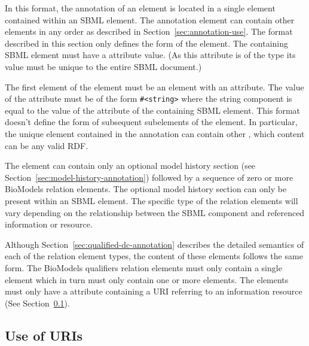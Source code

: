 In this format, the annotation of an element is located in a single
 element contained within an SBML
 element. The annotation element can contain
other elements in any order as described in 
Section~\ref{sec:annotation-use}.  The format described in this
section only defines the form of the  element. The
containing SBML \SBase element must have a  attribute
value. (As this attribute is of the type  its value
must be unique to the entire SBML document.)

The first element of the  element must be an
 element with an 
attribute. The value of the
 attribute must be of the form
\texttt{\#<string>} where the string component is equal to the
value of the  attribute of the containing SBML element.
This format doesn't define the form of subsequent
subelements of the  element. In particular, the unique  element contained in the annotation can contain other , which content can be any valid RDF.

The  element can contain only an optional
model history section (see
Section~\ref{sec:model-history-annotation}) followed by a sequence
of zero or more BioModels relation elements. The optional model
history section can only be present within an SBML \Model element.
The specific type of the relation elements will vary depending on
the relationship between the SBML component and referenced
information or resource.

Although Section~\ref{sec:qualified-dc-annotation} describes the
detailed semantics of each of the relation element types, the
content of these elements follows the same form.  The BioModels
qualifiers relation elements must only contain a single
 element which in turn must only contain one or
more  elements.  The  elements must
only have a  attribute containing a URI
referring to an information resource (See
Section~\ref{sec:uri-in-annotation}).


\subsection{Use of URIs}
\label{sec:uri-in-annotation}

